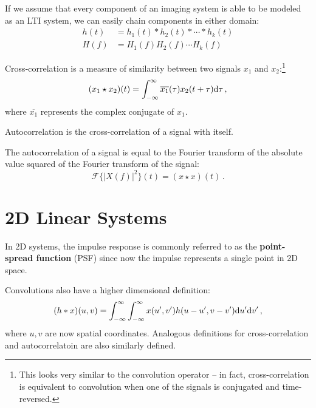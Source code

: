 If we assume that every component of an imaging system is able to be modeled as an LTI system, we can easily chain components in either domain:
\begin{align*}
    h(t) &= h_1(t) * h_2(t) * \cdots * h_k(t) \\
    H(f) &= H_1(f) H_2(f) \cdots H_k(f)
\end{align*}

\begin{defn}
Cross-correlation is a measure of similarity between two signals $x_1$ and $x_2$:\footnote{This looks very similar to the convolution operator -- in fact, cross-correlation is equivalent to convolution when one of the signals is conjugated and time-reversed.}
\begin{equation}
    (x_1 \star x_2)(t) = \int_{-\infty}^\infty \overline{x_1}(\tau)x_2(t+\tau) \mathrm d\tau \,,
\end{equation}
where $\overline{x_1}$ represents the complex conjugate of $x_1$.
\end{defn}

\begin{defn}[Autocorrelation]
Autocorrelation is the cross-correlation of a signal with itself.
\end{defn}

\begin{theorem}
The autocorrelation of a signal is equal to the Fourier transform of the absolute value squared of the Fourier transform of the signal:
\begin{equation}
    \mathcal F\{|X(f)|^2\}(t) = (x \star x)(t) \,.
\end{equation}
\end{theorem}

\section{2D Linear Systems}

In 2D systems, the impulse response is commonly referred to as the \textbf{point-spread function} (PSF) since now the impulse represents a single point in 2D space.

Convolutions also have a higher dimensional definition:
\begin{equation}
    (h * x)(u, v) = \int_{-\infty}^\infty \int_{-\infty}^\infty x(u', v') h(u - u', v - v') \mathrm d u' \mathrm d v' \,,
\end{equation}
where $u, v$ are now spatial coordinates.
Analogous definitions for cross-correlation and autocorrelatoin are also similarly defined.